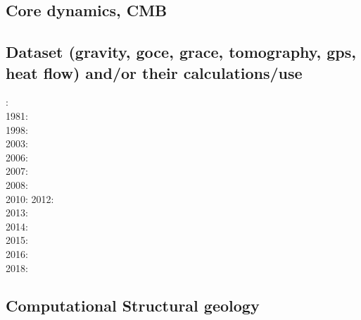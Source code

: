 \subsection*{Core dynamics, CMB}

\noindent
\cite{hayu96}
\cite{lahb08}\cite{gost08}

\subsection*{Dataset (gravity, goce, grace, tomography, gps, heat flow) 
and/or their calculations/use}
    

: \cite{rola77}\\
1981: \cite{dzan81}\\
1998: \cite{bisp98}\\
2003: \cite{krhh03}\cite{sosi03}\\
2006: \cite{masr06}\\
2007: \cite{mitk07}\\
2008: \cite{zhou08}\cite{zhou08}\\
2010: \cite{dada10}
2012: \cite{hawj12}\cite{resa12}\cite{hawj12}\cite{fesw12}\\
2013: \cite{ress13}\cite{ebbf13}\cite{davi13}\\
2014: \cite{paml14}\cite{ebbf14}\cite{krbk14}\\
2015: \cite{boem15}\cite{brrs15}\\
2016: \cite{kord16}\cite{moek16}\\
2018: \cite{pabn18}


\subsection*{Computational Structural geology}

\noindent
\cite{fige95}
\cite{acgf00}
\cite{trla00}
\cite{masc01}
\cite{manc08}
\cite{frem11}
\cite{naam17}
\cite{naam18}


